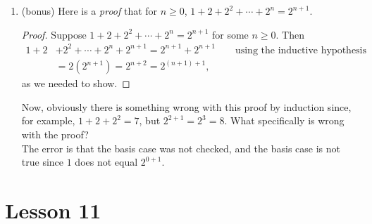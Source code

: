 \documentclass[11pt]{amsart}
\begin{document}
\begin{enumerate}
\item   (bonus) Here is a {\itshape proof} that for $n\geq 0$,  $1+ 2 + 2^2 +  \cdots + 2^n = 2^{n+1}$.
\begin{proof}
Suppose $1+ 2 + 2^2 +  \cdots + 2^n = 2^{n+1}$ for some $n\geq 0$. Then
\begin{align*}
 1+ 2 &+ 2^2 +  \cdots + 2^n  + 2^{n+1} = 2^{n+1} +2^{n+1} \qquad\text{using the inductive hypothesis}\\
 &= 2(2^{n+1}) = 2^{n+2} = 2^{(n+1)+1},
 \end{align*}
 as we needed to show.
 \end{proof}
 
 Now, obviously there is something wrong with this proof by induction since, for example,
 $1+2+2^2 = 7$, but $2^{2+1} = 2^3 = 8$. What specifically is wrong with the proof?\\[3pt]
 {\color{blue}
 The error is that the basis case was not checked, and the basis case is not true
 since $1$ does not equal $2^{0+1}$.\\[5pt]
}

\end{enumerate}

\section{Lesson 11}
\end{document}
